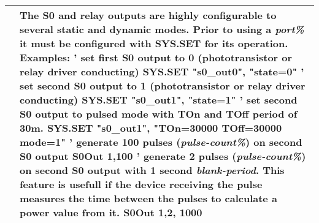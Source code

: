 \begin{table}[]
\begin{tabular}{|p{4cm}|p{10cm}|}
& The S0 and relay outputs are highly configurable to several static and dynamic modes. Prior to using a \textit{port\%} it must be configured with \textbf{SYS.SET} for its operation.\newline
Examples:\newline
' set first S0 output to 0 (phototransistor or relay driver conducting)\newline
\textbf{SYS.SET} "s0\_out0", "state=0"\newline
' set second S0 output to 1 (phototransistor or relay driver conducting)\newline
\textbf{SYS.SET} "s0\_out1", "state=1"\newline
' set second S0 output to pulsed mode with TOn and TOff period of 30m.\newline
\textbf{SYS.SET} "s0\_out1", "TOn=30000 TOff=30000 mode=1"\newline
' generate 100 pulses  (\textit{pulse-count\%}) on second S0 output\newline
\textbf{S0Out} 1,100\newline
' generate 2 pulses (\textit{pulse-count\%}) on second S0 output with 1 second \textit{blank-period}. This feature is usefull if the device receiving the pulse measures the time between the pulses to calculate a power value from it.\newline
\textbf{S0Out} 1,2, 1000
\\ \hline
\end{tabular}
\end{table}

